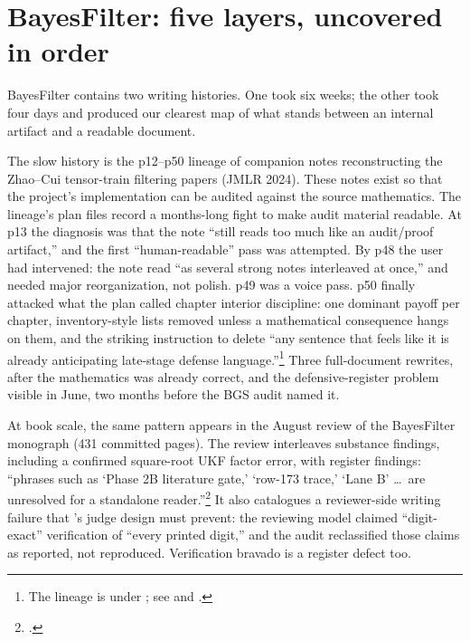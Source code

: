 \section{BayesFilter: five layers, uncovered in order}
\label{sec:bayesfilter}

BayesFilter contains two writing histories. One took six weeks; the other took
four days and produced our clearest map of what stands between an internal
artifact and a readable document.

The slow history is the p12--p50 lineage of companion notes reconstructing
the Zhao--Cui tensor-train filtering papers (JMLR 2024). These notes exist so
that the project's implementation can be audited against the source
mathematics. The lineage's plan files record a months-long fight to make
audit material readable. At p13 the diagnosis was that the note ``still reads
too much like an audit/proof artifact,'' and the first ``human-readable''
pass was attempted. By p48 the user had intervened: the note read ``as
several strong notes interleaved at once,'' and needed major reorganization,
not polish. p49 was a voice pass. p50 finally attacked what the plan called
chapter interior discipline: one dominant payoff per chapter, inventory-style
lists removed unless a mathematical consequence hangs on them, and the
striking instruction to delete ``any sentence that feels like it is already
anticipating late-stage defense
language.''\footnote{The lineage is under ; see  and .}
Three full-document rewrites, after the mathematics was already correct, and
the defensive-register problem visible in June, two months before the BGS
audit named it.

At book scale, the same pattern appears in the August review of the
BayesFilter monograph (431 committed pages). The review interleaves substance
findings, including a confirmed square-root UKF factor error, with register
findings: ``phrases such as `Phase 2B literature gate,' `row-173 trace,'
`Lane B' \ldots\ are unresolved for a standalone
reader.''\footnote{.}
It also catalogues a reviewer-side writing failure that \hv{}'s judge design
must prevent: the reviewing model claimed ``digit-exact'' verification of
``every printed digit,'' and the audit reclassified those claims as reported,
not reproduced. Verification bravado is a register defect too.

